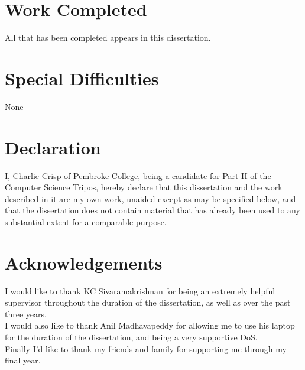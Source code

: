 \documentclass[12pt,a4paper,twoside,openright]{report}
\begin{document}
	
	\section*{Work Completed}
	
	All that has been completed appears in this dissertation.
	
	\section*{Special Difficulties}
	
	None
	 
	\newpage
	\section*{Declaration}
	
	I, Charlie Crisp of Pembroke College, being a candidate for Part II of the Computer
	Science Tripos, hereby declare that this dissertation and the work described in it are my own work,
	unaided except as may be specified below, and that the dissertation
	does not contain material that has already been used to any substantial
	extent for a comparable purpose.
	
	\bigskip
	\bigskip
	
	\tableofcontents
	
	\listoffigures
	
	\newpage
	\section*{Acknowledgements}
	
	I would like to thank KC Sivaramakrishnan for being an extremely helpful supervisor throughout the duration of the dissertation, as well as over the past three years.\\
	I would also like to thank Anil Madhavapeddy for allowing me to use his laptop for the duration of the dissertation, and being a very supportive DoS.\\
	Finally I'd like to thank my friends and family for supporting me through my final year.
	
	
	\pagestyle{headings}
	
\end{document}
